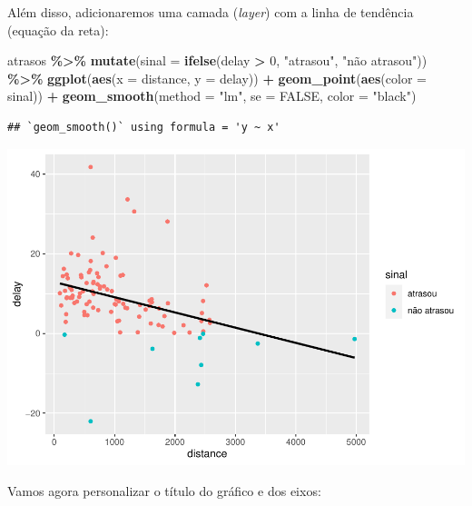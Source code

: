 \documentclass[
]{book}
\newenvironment{Shaded}{\begin{snugshade}}{\end{snugshade}}
\newcommand{\AttributeTok}[1]{\textcolor[rgb]{0.13,0.29,0.53}{#1}}
\newcommand{\ConstantTok}[1]{\textcolor[rgb]{0.56,0.35,0.01}{#1}}
\newcommand{\DecValTok}[1]{\textcolor[rgb]{0.00,0.00,0.81}{#1}}
\newcommand{\FunctionTok}[1]{\textcolor[rgb]{0.13,0.29,0.53}{\textbf{#1}}}
\newcommand{\NormalTok}[1]{#1}
\newcommand{\SpecialCharTok}[1]{\textcolor[rgb]{0.81,0.36,0.00}{\textbf{#1}}}
\newcommand{\StringTok}[1]{\textcolor[rgb]{0.31,0.60,0.02}{#1}}
\begin{document}
Além disso, adicionaremos uma camada (\textit{layer}) com a linha de tendência (equação da reta):

\begin{Shaded}
\begin{Highlighting}[]
\NormalTok{atrasos }\SpecialCharTok{\%\textgreater{}\%} 
  \FunctionTok{mutate}\NormalTok{(}\AttributeTok{sinal =} \FunctionTok{ifelse}\NormalTok{(delay }\SpecialCharTok{\textgreater{}} \DecValTok{0}\NormalTok{, }\StringTok{"atrasou"}\NormalTok{, }\StringTok{"não atrasou"}\NormalTok{)) }\SpecialCharTok{\%\textgreater{}\%}
  \FunctionTok{ggplot}\NormalTok{(}\FunctionTok{aes}\NormalTok{(}\AttributeTok{x =}\NormalTok{ distance, }\AttributeTok{y =}\NormalTok{ delay)) }\SpecialCharTok{+}
  \FunctionTok{geom\_point}\NormalTok{(}\FunctionTok{aes}\NormalTok{(}\AttributeTok{color =}\NormalTok{ sinal)) }\SpecialCharTok{+}
  \FunctionTok{geom\_smooth}\NormalTok{(}\AttributeTok{method =} \StringTok{"lm"}\NormalTok{,}
              \AttributeTok{se =} \ConstantTok{FALSE}\NormalTok{,}
              \AttributeTok{color =} \StringTok{"black"}\NormalTok{)}
\end{Highlighting}
\end{Shaded}

\begin{verbatim}
## `geom_smooth()` using formula = 'y ~ x'
\end{verbatim}

\includegraphics{AprendendoR_files/figure-latex/unnamed-chunk-61-1.pdf}

Vamos agora personalizar o título do gráfico e dos eixos:
\end{document}
